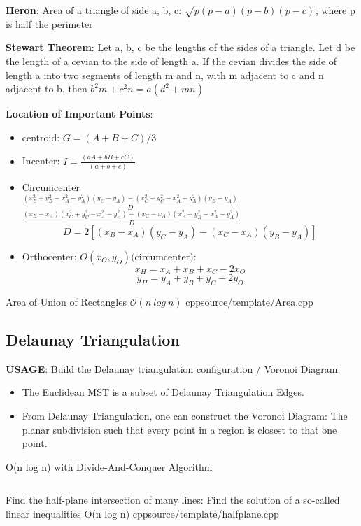 \textbf{Heron}: Area of a triangle of side a, b, c: $\sqrt{p(p-a)(p-b)(p-c)}$, where p is half the perimeter

\textbf{Stewart Theorem}: Let a, b, c be the lengths of the sides of a triangle. Let d be the length of a cevian to the side of length a. If the cevian divides the side of length a into two segments of length m and n, with m adjacent to c and n adjacent to b, then $b^2m+c^2n=a(d^2+mn)$

\textbf{Location of Important Points}:
\begin{itemize}
    \item centroid: $G = (A + B + C) / 3$
    \item Incenter: $I = \frac{(aA + bB + cC)}{(a + b + c)}$ 
    \item Circumcenter \\ 
    $\frac{(x_B^2 + y_B^2 - x_A^2 - y_A^2)(y_C - y_A) - (x_C^2 + y_C^2 - x_A^2 - y_A^2)(y_B - y_A)}{D}$ \\
    $\frac{(x_B - x_A)(x_C^2 + y_C^2 - x_A^2 - y_A^2) - (x_C - x_A)(x_B^2 + y_B^2 - x_A^2 - y_A^2)}{D}$ \\
    $$ D = 2 \left[ (x_B - x_A)(y_C - y_A) - (x_C - x_A)(y_B - y_A) \right] $$
    \item Orthocenter: $O(x_O, y_O) (\text{circumcenter)}$:$$x_H = x_A + x_B + x_C - 2x_O$$$$y_H = y_A + y_B + y_C - 2y_O
$$
\end{itemize}

{Area of Union of Rectangles}
{$\mathcal{O}(n \ log \ n)$}
{cpp}{source/template/Area.cpp}

\subsection{Delaunay Triangulation}
\textbf{USAGE}: Build the Delaunay triangulation configuration / Voronoi Diagram:
\begin{itemize}
\item The Euclidean MST is a subset of Delaunay Triangulation Edges.
\item From Delaunay Triangulation, one can construct the Voronoi Diagram: The planar subdivision such that every point in a region is closest to that one point.
\end{itemize}
{O(n log n) with Divide-And-Conquer Algorithm}
\inputminted[]{cpp}{source/template/Delaunay.cpp}


{Find the half-plane intersection of many lines: Find the solution of a so-called linear inequalities}
{O(n log n)}
{cpp}{source/template/halfplane.cpp}
